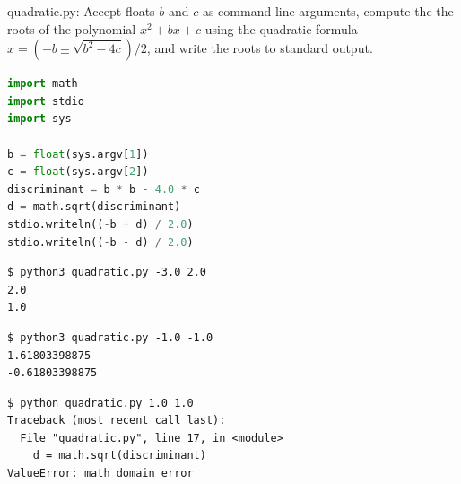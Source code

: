\documentclass[8pt,a4paper,compress]{beamer}
\begin{document}
\begin{frame}[fragile]
\pause

\begin{framed}
\tiny quadratic.py: Accept floats $b$ and $c$ as command-line arguments, compute the the roots of the polynomial $x^2 + bx + c$ using the quadratic formula $x=(-b\pm \sqrt{b^2-4c})/2$, and write the roots to standard output.
\end{framed}

\begin{lstlisting}[language=Python,style=focusin]
import math
import stdio
import sys

b = float(sys.argv[1])
c = float(sys.argv[2])
discriminant = b * b - 4.0 * c
d = math.sqrt(discriminant)
stdio.writeln((-b + d) / 2.0)
stdio.writeln((-b - d) / 2.0)
\end{lstlisting}

\pause\bigskip

\begin{lstlisting}[language={},style=focusin]
$ python3 quadratic.py -3.0 2.0
2.0
1.0
\end{lstlisting}

\pause\bigskip

\begin{lstlisting}[language={}]
$ python3 quadratic.py -1.0 -1.0
1.61803398875
-0.61803398875
\end{lstlisting}

\pause\bigskip

\begin{lstlisting}[language={},style=focusin]
$ python quadratic.py 1.0 1.0
Traceback (most recent call last):
  File "quadratic.py", line 17, in <module>
    d = math.sqrt(discriminant)
ValueError: math domain error
\end{lstlisting}
\end{frame}
\end{document}
